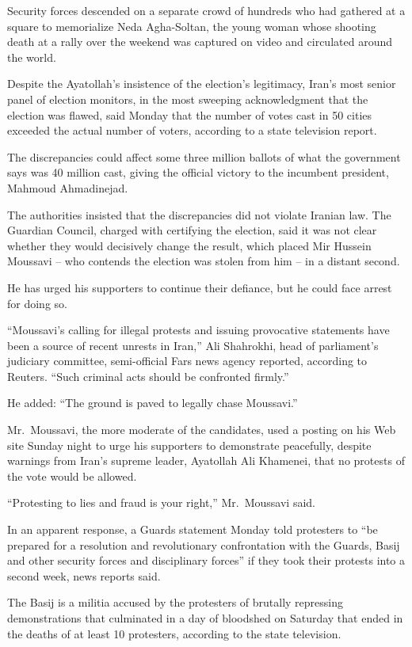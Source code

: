 ﻿\documentclass[12pt,a4paper,onecolumn]{article}
\begin{document}
Security forces descended on a separate crowd of hundreds who had gathered at a square to
memorialize Neda Agha-Soltan, the young woman whose shooting death at a rally over the weekend was
captured on video and circulated around the world.

Despite the Ayatollah's insistence of the election's legitimacy, Iran's most senior panel of
election monitors, in the most sweeping acknowledgment that the election was flawed, said Monday
that the number of votes cast in 50 cities exceeded the actual number of voters, according to a
state television report.

The discrepancies could affect some three million ballots of what the government says was 40 million
cast, giving the official victory to the incumbent president, Mahmoud Ahmadinejad.

The authorities insisted that the discrepancies did not violate Iranian law. The Guardian Council,
charged with certifying the election, said it was not clear whether they would decisively change the
result, which placed Mir Hussein Moussavi -- who contends the election was stolen from him -- in a
distant second.

He has urged his supporters to continue their defiance, but he could face arrest for doing so.

``Moussavi's calling for illegal protests and issuing provocative statements have been a source of
recent unrests in Iran,'' Ali Shahrokhi, head of parliament's judiciary committee, semi-official
Fars news agency reported, according to Reuters. ``Such criminal acts should be confronted firmly.''

He added: ``The ground is paved to legally chase Moussavi.''

Mr.~Moussavi, the more moderate of the candidates, used a posting on his Web site Sunday night to
urge his supporters to demonstrate peacefully, despite warnings from Iran's supreme leader,
Ayatollah Ali Khamenei, that no protests of the vote would be allowed.

``Protesting to lies and fraud is your right,'' Mr.~Moussavi said.

In an apparent response, a Guards statement Monday told protesters to ``be prepared for a resolution
and revolutionary confrontation with the Guards, Basij and other security forces and disciplinary
forces'' if they took their protests into a second week, news reports said.

The Basij is a militia accused by the protesters of brutally repressing demonstrations that
culminated in a day of bloodshed on Saturday that ended in the deaths of at least 10 protesters,
according to the state television.
\end{document}
